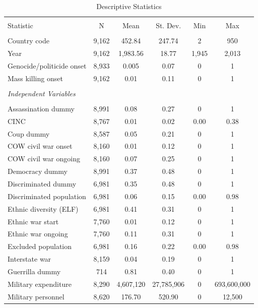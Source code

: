 \begin{table}[!htbp] \centering 
  \caption{Descriptive Statistics} 
  \label{tab:mk-ds} 
\footnotesize 
\begin{tabular}{@{\extracolsep{5pt}}lccccc} 
\\[-1.8ex]\hline 
\hline \\[-1.8ex] 
Statistic & \multicolumn{1}{c}{N} & \multicolumn{1}{c}{Mean} & \multicolumn{1}{c}{St. Dev.} & \multicolumn{1}{c}{Min} & \multicolumn{1}{c}{Max} \\ 
\hline \\[-1.8ex] 
Country code & 9,162 & 452.84 & 247.74 & 2 & 950 \\ 
Year & 9,162 & 1,983.56 & 18.77 & 1,945 & 2,013 \\ 
Genocide/politicide onset & 8,933 & 0.005 & 0.07 & 0 & 1\\ 
Mass killing onset & 9,162 & 0.01 & 0.11 & 0 & 1 \\ 
&&&&&\\
\textit{Independent Variables} & & & & \\
&&&&&\\
Assassination dummy & 8,991 & 0.08 & 0.27 & 0 & 1 \\ 
CINC & 8,767 & 0.01 & 0.02 & 0.00 & 0.38 \\ 
Coup dummy & 8,587 & 0.05 & 0.21 & 0 & 1 \\ 
COW civil war onset & 8,160 & 0.01 & 0.12 & 0 & 1 \\ 
COW civil war ongoing & 8,160 & 0.07 & 0.25 & 0 & 1 \\ 
Democracy dummy & 8,991 & 0.37 & 0.48 & 0 & 1 \\ 
Discriminated dummy & 6,981 & 0.35 & 0.48 & 0 & 1 \\ 
Discriminated population & 6,981 & 0.06 & 0.15 & 0.00 & 0.98 \\ 
Ethnic diversity (ELF) & 6,981 & 0.41 & 0.31 & 0 & 1 \\ 
Ethnic war start & 7,760 & 0.01 & 0.12 & 0 & 1 \\ 
Ethnic war ongoing & 7,760 & 0.11 & 0.31 & 0 & 1 \\ 
Excluded population & 6,981 & 0.16 & 0.22 & 0.00 & 0.98 \\ 
Interstate war & 8,159 & 0.04 & 0.19 & 0 & 1 \\ 
Guerrilla dummy & 714 & 0.81 & 0.40 & 0 & 1 \\ 
Military expenditure & 8,290 & 4,607,120 & 27,785,906 & 0 & 693,600,000 \\ 
Military personnel & 8,620 & 176.70 & 520.90 & 0 & 12,500 \\ 

\end{tabular}
\end{table}
